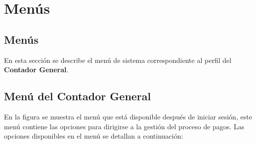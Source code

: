 \chapter{Menús}
\section{Menús}
En esta sección se describe el menú de sistema correspondiente al perfil del \textbf{Contador General}. 
%
\section{Menú del Contador General}
En la figura  se muestra el menú que está disponible después de iniciar sesión, este menú contiene las opciones para dirigirse a la gestión del proceso de pagos. 
Las opciones disponibles en el menú se detallan a continuación:


